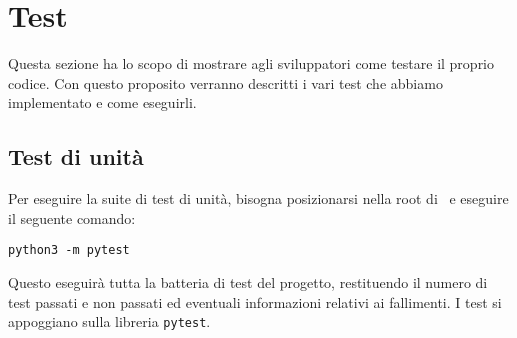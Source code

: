 \section{Test}

Questa sezione ha lo scopo di mostrare agli sviluppatori come testare il proprio codice. Con questo proposito verranno descritti i vari test che abbiamo
implementato e come eseguirli.

\subsection{Test di unità}

Per eseguire la suite di test di unità, bisogna posizionarsi nella root di \progetto\ e eseguire il seguente comando:

\begin{center}
    \texttt{python3 -m pytest}
\end{center}

Questo eseguirà tutta la batteria di test del progetto, restituendo il numero di test passati e non passati ed eventuali informazioni relativi ai fallimenti.
I test si appoggiano sulla libreria \texttt{pytest}.
